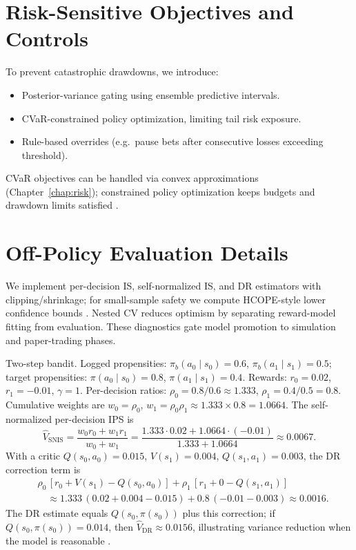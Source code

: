 \section{Risk-Sensitive Objectives and Controls}
To prevent catastrophic drawdowns, we introduce:
\begin{itemize}
  \item Posterior-variance gating using ensemble predictive intervals.
  \item CVaR-constrained policy optimization, limiting tail risk exposure.
  \item Rule-based overrides (e.g.\ pause bets after consecutive losses exceeding threshold).
\end{itemize}
CVaR objectives can be handled via convex approximations (Chapter~\ref{chap:risk}); constrained policy optimization keeps budgets and drawdown limits satisfied \citep{achiam2017cpo,tamar2015cvar}.

\section{Off-Policy Evaluation Details}
We implement per-decision IS, self-normalized IS, and DR estimators with clipping/shrinkage; for small-sample safety we compute HCOPE-style lower confidence bounds \citep{thomas2015}. Nested CV reduces optimism by separating reward-model fitting from evaluation. These diagnostics gate model promotion to simulation and paper-trading phases.

\begin{example}
Two-step bandit. Logged propensities: $\pi_b(a_0\mid s_0)=0.6$, $\pi_b(a_1\mid s_1)=0.5$; target propensities: $\pi(a_0\mid s_0)=0.8$, $\pi(a_1\mid s_1)=0.4$. Rewards: $r_0=0.02$, $r_1=-0.01$, $\gamma=1$. Per-decision ratios: $\rho_0=0.8/0.6\approx1.333$, $\rho_1=0.4/0.5=0.8$. Cumulative weights are $w_0=\rho_0$, $w_1=\rho_0\rho_1\approx1.333\times0.8=1.0664$. The self-normalized per-decision IPS is
\[\hat V_{\text{SNIS}}=\frac{w_0 r_0 + w_1 r_1}{w_0+w_1}=\frac{1.333\cdot0.02 + 1.0664\cdot(-0.01)}{1.333+1.0664}\approx 0.0067.\]
With a critic $Q(s_0,a_0)=0.015$, $V(s_1)=0.004$, $Q(s_1,a_1)=0.003$, the DR correction term is
\[\begin{aligned}
&\rho_0\,[r_0+V(s_1)-Q(s_0,a_0)] + \rho_1\,[r_1+0-Q(s_1,a_1)]\\
&\quad\approx 1.333\,(0.02+0.004-0.015) + 0.8\,(-0.01-0.003) \approx 0.0016.
\end{aligned}\]
The DR estimate equals $Q(s_0,\pi(s_0))$ plus this correction; if $Q(s_0,\pi(s_0))\!=\!0.014$, then $\hat V_{\text{DR}}\approx 0.0156$, illustrating variance reduction when the model is reasonable \citep{dudik2014,jiang2016}.
\end{example}

